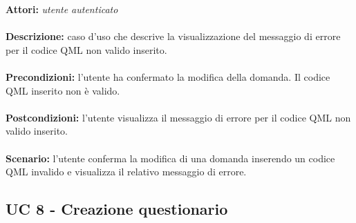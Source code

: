 \documentclass[a4paper,11pt]{article}
\begin{document}

\textbf{Attori:} \textit{utente autenticato}
\\ \\
\textbf{Descrizione:} caso d'uso che descrive la visualizzazione del messaggio di errore per il codice QML non valido inserito.\\
\\
\textbf{Precondizioni:} l'utente ha confermato la modifica della domanda. Il codice QML inserito non è valido.\\
\\
\textbf{Postcondizioni:} l’utente visualizza il messaggio di errore per il codice QML non valido inserito.\\
\\
\textbf{Scenario:} l'utente conferma la modifica di una domanda inserendo un codice QML invalido e visualizza il relativo messaggio di errore.\\


\newpage
\subsection{UC 8 - Creazione questionario}
\end{document}
